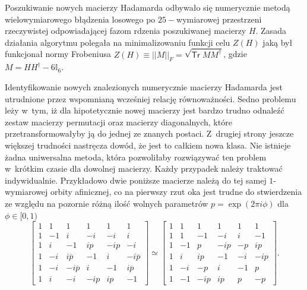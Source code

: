 \documentclass[a4paper,12pt,twoside]{article}
\begin{document}
Poszukiwanie nowych macierzy Hadamarda odbywa{\l}o si\k{e} numerycznie metod\k{a} wie\-lo\-wy\-mia\-ro\-we\-go b{\l}\k{a}dzenia losowego po $25-$wymiarowej przestrzeni rzeczywistej od\-po\-wia\-da\-j\k{a}\-cej fazom rdzenia poszukiwanej macierzy $H$. Zasada dzia{\l}ania algorytmu polega{\l}a na minimalizowaniu funkcji celu $Z(H)$ jak\k{a} by{\l} funkcjona{\l} normy Frobeniusa $Z(H) \equiv ||M||_F = \sqrt{\textsf{Tr} \;M M^{\dagger}}$, gdzie $M = HH^{\dagger} - 6\mathbb{I}_6$.

Identyfikowanie nowych znalezionych numerycznie macierzy Hadamarda jest utrudnione przez wspomnian\k{a} wcze\'{s}niej relacj\k{e} r\'{o}wnowa\.{z}no\'{s}ci. Sedno problemu le\.{z}y w~tym, i\.{z} dla hipotetycznie nowej macierzy jest bardzo trudno odnale\'{z}\'{c} zestaw macierzy permutacji oraz macierzy diagonalnych, kt\'{o}re przetransformowa{\l}yby j\k{a} do jednej ze znanych postaci. Z~drugiej strony jeszcze wi\k{e}kszej trudno\'{s}ci nastr\k{e}cza dow\'{o}d, \.{z}e jest to ca{\l}kiem nowa klasa. Nie istnieje \.{z}adna uniwersalna metoda, kt\'{o}ra pozwoli{\l}aby rozwi\k{a}zywa\'{c} ten problem w~kr\'{o}tkim czasie dla dowolnej macierzy. Ka\.{z}dy przypadek nale\.{z}y traktowa\'{c} indywidualnie. Przyk{\l}adowo dwie poni\.{z}sze macierze nale\.{z}\k{a} do tej samej $1$-wymiarowej orbity afinicznej, co na pierwszy rzut oka jest trudne do stwierdzenia ze wzgl\k{e}du na pozornie r\'{o}\.{z}n\k{a} ilo\'{s}\'{c} wolnych parametr\'{o}w $p=\exp(2 \pi i \phi)$ dla $\phi\in[0,1)$
\begin{equation}
\left[
\begin{array}{rrrrrr}
1 &  1 &               1 &    1 &    1 &  1 \\
1 & -1 &               i &   -i &   -i &  i \\
1 &  i &              -1 &  i p & -i p & -i \\
1 & -i &  i \overline{p} &   -1 &    i & -i \overline{p} \\
1 & -i & -i \overline{p} &    i &   -1 &  i \overline{p} \\
1 &  i &              -i & -i p &  i p & -1
\end{array}
\right] \simeq
\left[
\begin{array}{rrrrrr}
1 &   1 &    1 &    1 &   1 &    1\\
1 &   1 &   -1 &   -i &   i &   -1\\
1 &  -1 &    p & -i p &  -p &  i p\\
1 &   i &  i p &   -1 &  -i & -i p\\
1 &  -i &   -p &    i &  -1 &    p\\
1 &  -1 & -i p &  i p &   p &   -p
\end{array}
\right].
\end{equation}
\end{document}
